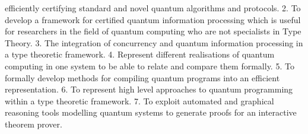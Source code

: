 \documentclass[a4paper]{article}
\begin{document}

efficiently certifying standard and novel quantum algorithms and
protocols.
2.  To develop a framework for certified quantum information
processing which is useful for researchers in the field of quantum
computing who are not specialists in Type Theory.  
3. The integration of concurrency and quantum information
processing in a type theoretic framework.
4. Represent different realisations of quantum computing in one system
to be able to relate and compare them formally.
5. To formally develop methods for compiling quantum programs into an
efficient representation.
6. To represent high level approaches to quantum programming within a
type theoretic framework.
7. To exploit automated and graphical reasoning tools modelling
quantum systems to generate proofs for an interactive theorem prover.

\end{document}
